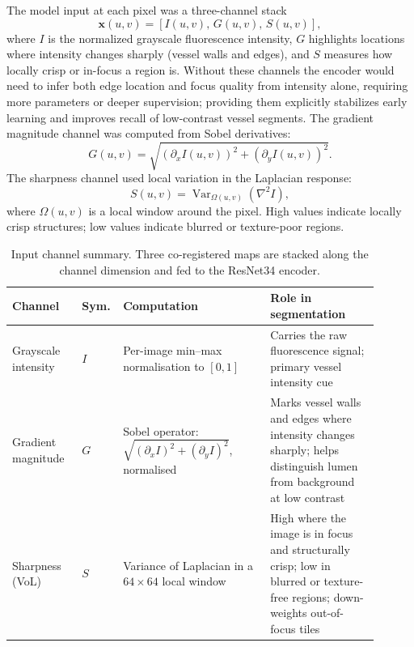 \documentclass[11pt,letterpaper]{article}
\begin{document}
The model input at each pixel was a three-channel stack
\begin{equation}
\mathbf{x}(u,v) = \left[I(u,v),\, G(u,v),\, S(u,v)\right],
\end{equation}
where $I$ is the normalized grayscale fluorescence intensity, $G$ highlights locations where intensity changes sharply (vessel walls and edges), and $S$ measures how locally crisp or in-focus a region is. Without these channels the encoder would need to infer both edge location and focus quality from intensity alone, requiring more parameters or deeper supervision; providing them explicitly stabilizes early learning and improves recall of low-contrast vessel segments.
The gradient magnitude channel was computed from Sobel derivatives:
\begin{equation}
G(u,v) = \sqrt{\left(\partial_x I(u,v)\right)^2 + \left(\partial_y I(u,v)\right)^2}.
\end{equation}
The sharpness channel used local variation in the Laplacian response:
\begin{equation}
S(u,v) = \operatorname{Var}_{\Omega(u,v)}\left(\nabla^2 I\right),
\end{equation}
where $\Omega(u,v)$ is a local window around the pixel. High values indicate locally crisp structures; low values indicate blurred or texture-poor regions.

\begin{table}[htbp]
\centering
\caption{Input channel summary. Three co-registered maps are stacked along the channel dimension and fed to the ResNet34 encoder.}
\begin{tabular}{p{0.18\linewidth}p{0.06\linewidth}p{0.38\linewidth}p{0.28\linewidth}}
\toprule
Channel & Sym. & Computation & Role in segmentation \\
\midrule
Grayscale intensity & $I$ & Per-image min--max normalisation to $[0,1]$ & Carries the raw fluorescence signal; primary vessel intensity cue \\
Gradient magnitude & $G$ & Sobel operator: $\sqrt{(\partial_x I)^2+(\partial_y I)^2}$, normalised & Marks vessel walls and edges where intensity changes sharply; helps distinguish lumen from background at low contrast \\
Sharpness (VoL) & $S$ & Variance of Laplacian in a $64{\times}64$ local window & High where the image is in focus and structurally crisp; low in blurred or texture-free regions; down-weights out-of-focus tiles \\
\bottomrule
\end{tabular}
\label{tab:input-channels}
\end{table}
\end{document}

